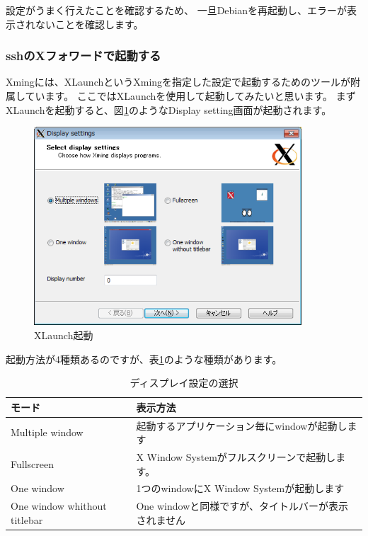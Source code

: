 \documentclass[mingoth,a4paper]{jsarticle}
\begin{document}
設定がうまく行えたことを確認するため、
一旦Debianを再起動し、エラーが表示されないことを確認します。

\subsubsection{sshのXフォワードで起動する}
Xmingには、XLaunchというXmingを指定した設定で起動するためのツールが附属しています。
ここではXLaunchを使用して起動してみたいと思います。
まずXLaunchを起動すると、図\ref{fig:colinux_xlaunch}のようなDisplay setting画面が起動されます。
\begin{figure}[htbp]
 \begin{center}
  \includegraphics[width=100mm]{image200808/colinux_xlaunch.png}
 \end{center}
 \caption{XLaunch起動}
 \label{fig:colinux_xlaunch}
\end{figure}

起動方法が4種類あるのですが、表\ref{tab:display_setting}のような種類があります。
\begin{table}[htbp]
\begin{center}
  \begin{tabular}[htbp]{|l|l|}\hline
    モード & 表示方法\\ \hline\hline
    Multiple window & 起動するアプリケーション毎にwindowが起動します\\ \hline
    Fullscreen & X Window Systemがフルスクリーンで起動します。\\ \hline
    One window & 1つのwindowにX Window Systemが起動します\\ \hline
    One window whithout titlebar & One windowと同様ですが、タイトルバーが表示されません\\ \hline
  \end{tabular}
  \caption{ディスプレイ設定の選択}
  \label{tab:display_setting}
\end{center}
\end{table}
\end{document}
